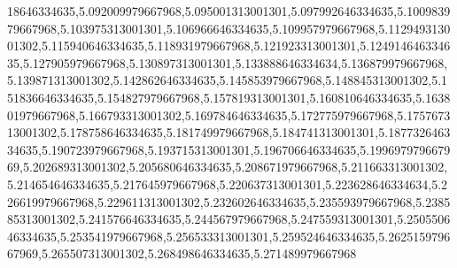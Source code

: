 18646334635,5.092009979667968,5.095001313001301,5.097992646334635,5.100983979667968,5.103975313001301,5.106966646334635,5.109957979667968,5.112949313001302,5.115940646334635,5.118931979667968,5.121923313001301,5.124914646334635,5.127905979667968,5.130897313001301,5.133888646334634,5.136879979667968,5.139871313001302,5.142862646334635,5.145853979667968,5.148845313001302,5.151836646334635,5.154827979667968,5.157819313001301,5.160810646334635,5.163801979667968,5.166793313001302,5.169784646334635,5.172775979667968,5.175767313001302,5.178758646334635,5.181749979667968,5.184741313001301,5.187732646334635,5.190723979667968,5.193715313001301,5.196706646334635,5.199697979667969,5.202689313001302,5.205680646334635,5.208671979667968,5.211663313001302,5.214654646334635,5.217645979667968,5.220637313001301,5.223628646334634,5.226619979667968,5.229611313001302,5.232602646334635,5.235593979667968,5.238585313001302,5.241576646334635,5.244567979667968,5.247559313001301,5.250550646334635,5.253541979667968,5.256533313001301,5.259524646334635,5.262515979667969,5.265507313001302,5.268498646334635,5.271489979667968
